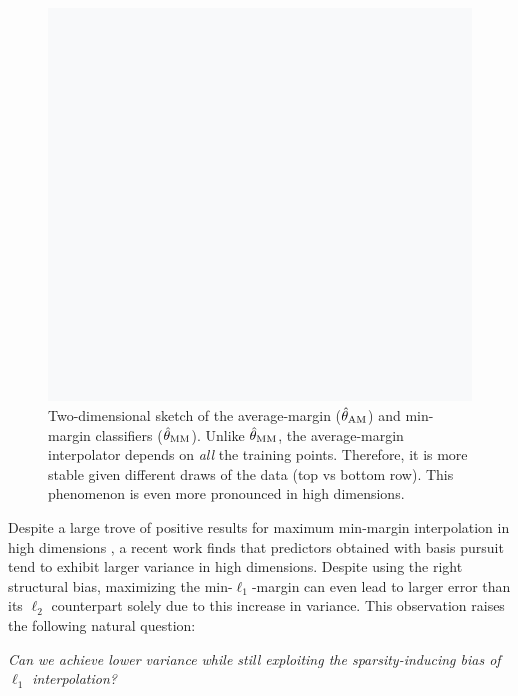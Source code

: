 \begin{figure}[t]
  \centering
  \includegraphics[width=\columnwidth]{figures/teaser_sketch.png}


  \caption{Two-dimensional sketch of the average-margin ($\hat{\theta}_{\mathrm{AM}}$) and min-margin
  classifiers ($\hat{\theta}_{\mathrm{MM}}$). Unlike $\hat{\theta}_{\mathrm{MM}}$, the average-margin interpolator depends on
\emph{all} the training points. Therefore, it is more stable given different
draws of the data (top vs bottom row). This phenomenon is even more pronounced
in high dimensions.}
\label{fig:teaser}

\end{figure}

Despite a large trove of positive results for maximum min-margin interpolation
in high dimensions \citep{Hastie22, wang22}, a recent work \citep{konstantin}
finds that predictors obtained with basis pursuit tend to exhibit larger
variance in high dimensions. Despite using the right structural bias, maximizing
the min-$\ell_1$-margin can even lead to larger error than its $\ell_2$
counterpart solely due to this increase in variance. This observation raises the
following natural question:

\begin{center}

\emph{Can we achieve lower variance while still exploiting the sparsity-inducing
bias of $\ell_1$ interpolation?}

\end{center}

